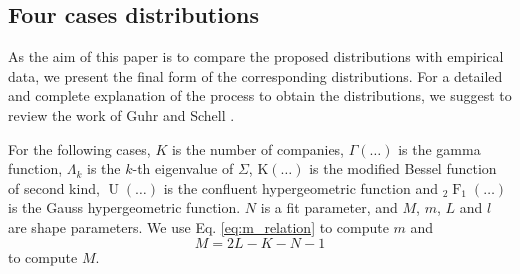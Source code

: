 \subsection{Four cases distributions}\label{subsec:distributions}

As the aim of this paper is to compare the proposed distributions with
empirical data, we present the final form of the corresponding distributions.
For a detailed and complete explanation of the process to obtain the
distributions, we suggest to review the work of Guhr and Schell
\cite{exact_distributions_guhr}.

For the following cases, $K$ is the number of companies,
$\Gamma\left(\ldots\right)$ is the gamma function, $\Lambda_{k}$ is the $k$-th
eigenvalue of $\Sigma$, $\operatorname{K\left(\ldots\right)}$ is the modified
Bessel function of second kind, $\operatorname{U}\left(\ldots\right)$ is the
confluent hypergeometric function and
$_{2}\operatorname{F}_{1}\left(\ldots\right)$ is the Gauss hypergeometric
function. $N$ is a fit parameter, and $M$, $m$, $L$ and $l$ are shape
parameters. We use Eq. \ref{eq:m_relation} to compute $m$ and
\begin{equation}
    M = 2L - K - N - 1
\end{equation}
to compute $M$.

